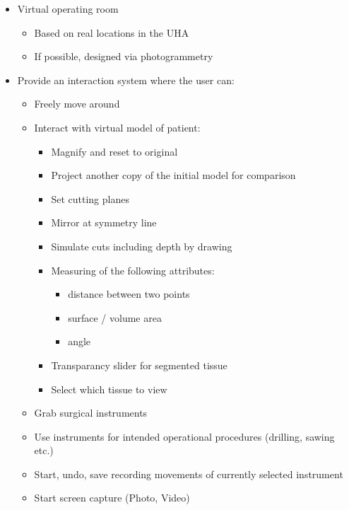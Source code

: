 \begin{itemize}
    \item Virtual operating room
        \begin{itemize}
            \item Based on real locations in the UHA
            \item If possible, designed via photogrammetry
        \end{itemize}
    \item Provide an interaction system where the user can:
        \begin{itemize}
            \item Freely move around
            \item Interact with virtual model of patient:
                \begin{itemize}
                    \item Magnify and reset to original
                    \item Project another copy of the initial model for comparison
                    \item Set cutting planes
                    \item Mirror at symmetry line
                    \item Simulate cuts including depth by drawing
                    \item Measuring of the following attributes:
                        \begin{itemize}
                            \item distance between two points
                            \item surface / volume area
                            \item angle
                        \end{itemize}
                    \item Transparancy slider for segmented tissue
                    \item Select which tissue to view
                \end{itemize}
            \item Grab surgical instruments
            \item Use instruments for intended operational procedures (drilling, sawing etc.)
            \item Start, undo, save recording movements of currently selected instrument 
            \item Start screen capture (Photo, Video)

\end{itemize}
\end{itemize}
